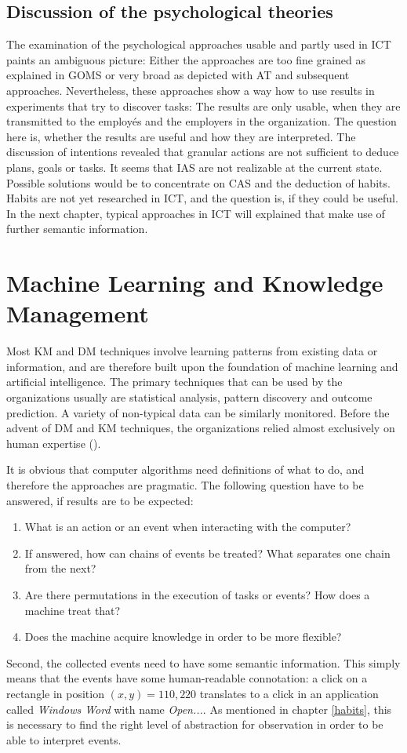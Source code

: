 \subsection{Discussion of the psychological theories}
\label{discussionpsychology}
The examination of the psychological approaches usable and partly used in \ac{ICT} paints an ambiguous picture: Either the approaches are too fine grained as explained in \ac{GOMS} or very broad as depicted with \ac{AT} and subsequent approaches. Nevertheless, these approaches show a way how to use results in experiments that try to discover tasks: The results are only usable, when they are transmitted to the employés and the employers in the organization. The question here is, whether the results are useful and how they are interpreted. The discussion of intentions revealed that granular actions are not sufficient to deduce plans, goals or tasks. It seems that \ac{IAS} are not realizable at the current state. Possible solutions would be to concentrate on \ac{CAS} and the deduction of habits. Habits are not yet researched in \ac{ICT}, and the question is, if they could be useful. In the next chapter, typical approaches in \ac{ICT} will explained that make use of further semantic information.

\section{Machine Learning and Knowledge Management}
Most KM and \ac{DM} techniques involve learning patterns from existing data or information, and are therefore built upon the foundation of machine learning and artificial intelligence. The primary techniques that can be used by the organizations usually are statistical analysis, pattern discovery and outcome prediction. A variety of non-typical data can be similarly monitored. Before the advent of \acs{DM} and \acs{KM} techniques, the organizations relied almost exclusively on human expertise (\cite{tsai2012knowledge}). 

It is obvious that computer algorithms need definitions of what to do, and therefore the approaches are pragmatic. The following question have to be answered, if results are to be expected:
\begin{enumerate}
  \item What is an action or an event when interacting with the computer?
  \item If answered, how can chains of events be treated? What separates one chain from the next?
  \item Are there permutations in the execution of tasks or events? How does a machine treat that?
  \item Does the machine acquire knowledge in order to be more flexible?
\end{enumerate}
Second, the collected events need to have some semantic information. This simply means that the events have some human-readable connotation: a click on a rectangle in position $(x,y)=110,220$ translates to a click in an application called \textit{Windows Word} with name \textit{Open...}. As mentioned in chapter \ref{habits}, this is necessary to find the right level of abstraction for observation in order to be able to interpret events.

